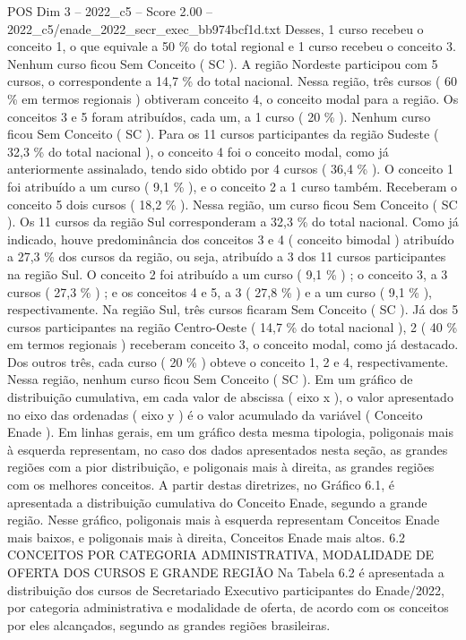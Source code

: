 \begin{textsample}{POS Dim 3 – 2022\_c5 – Score 2.00 – 2022\_c5/enade\_2022\_secr\_exec\_bb974bcf1d.txt}
Desses, 1 curso recebeu o conceito 1, o que equivale a 50 \% do total regional e 1 curso recebeu o conceito 3.
Nenhum curso ficou Sem Conceito ( SC ).
A região Nordeste participou com 5 cursos, o correspondente a 14,7 \% do total nacional.
Nessa região, três cursos ( 60 \% em termos regionais ) obtiveram conceito 4, o conceito modal para a região.
Os conceitos 3 e 5 foram atribuídos, cada um, a 1 curso ( 20 \% ).
Nenhum curso ficou Sem Conceito ( SC ).
Para os 11 cursos participantes da região Sudeste ( 32,3 \% do total nacional ), o conceito 4 foi o conceito modal, como já anteriormente assinalado, tendo sido obtido por 4 cursos ( 36,4 \% ).
O conceito 1 foi atribuído a um curso ( 9,1 \% ), e o conceito 2 a 1 curso também.
Receberam o conceito 5 dois cursos ( 18,2 \% ).
Nessa região, um curso ficou Sem Conceito ( SC ).
Os 11 cursos da região Sul corresponderam a 32,3 \% do total nacional.
Como já indicado, houve predominância dos conceitos 3 e 4 ( conceito bimodal ) atribuído a 27,3 \% dos cursos da região, ou seja, atribuído a 3 dos 11 cursos participantes na região Sul.
O conceito 2 foi atribuído a um curso ( 9,1 \% ) ; o conceito 3, a 3 cursos ( 27,3 \% ) ; e os conceitos 4 e 5, a 3 ( 27,8 \% ) e a um curso ( 9,1 \% ), respectivamente.
Na região Sul, três cursos ficaram Sem Conceito ( SC ).
Já dos 5 cursos participantes na região Centro-Oeste ( 14,7 \% do total nacional ), 2 ( 40 \% em termos regionais ) receberam conceito 3, o conceito modal, como já destacado.
Dos outros três, cada curso ( 20 \% ) obteve o conceito 1, 2 e 4, respectivamente.
Nessa região, nenhum curso ficou Sem Conceito ( SC ).
Em um gráfico de distribuição cumulativa, em cada valor de abscissa ( eixo x ), o valor apresentado no eixo das ordenadas ( eixo y ) é o valor acumulado da variável ( Conceito Enade ).
Em linhas gerais, em um gráfico desta mesma tipologia, poligonais mais à esquerda representam, no caso dos dados apresentados nesta seção, as grandes regiões com a pior distribuição, e poligonais mais à direita, as grandes regiões com os melhores conceitos.
A partir destas diretrizes, no Gráfico 6.1, é apresentada a distribuição cumulativa do Conceito Enade, segundo a grande região.
Nesse gráfico, poligonais mais à esquerda representam Conceitos Enade mais baixos, e poligonais mais à direita, Conceitos Enade mais altos. 6.2 CONCEITOS POR CATEGORIA ADMINISTRATIVA, MODALIDADE DE OFERTA DOS CURSOS E GRANDE REGIÃO Na Tabela 6.2 é apresentada a distribuição dos cursos de Secretariado Executivo participantes do Enade/2022, por categoria administrativa e modalidade de oferta, de acordo com os conceitos por eles alcançados, segundo as grandes regiões brasileiras.

\end{textsample}
